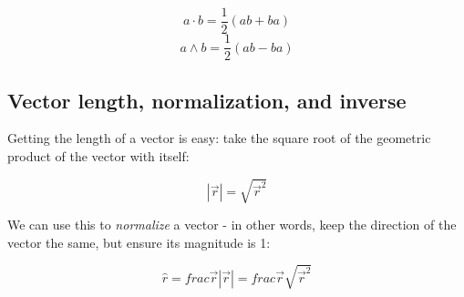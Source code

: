$$ a \cdot b = \frac{1}{2}\left(ab + ba\right)$$
$$ a \wedge b = \frac{1}{2}\left(ab - ba\right)$$

\subsection{Vector length, normalization, and inverse}

Getting the length of a vector is easy: take the square root of the geometric product of the vector
with itself:

$$\left|\vec{r}\right| = \sqrt{\vec{r}^2}$$

We can use this to \textit{normalize} a vector - in other words, keep the direction of the vector 
the same, but ensure its magnitude is 1:

$$\hat{r} = frac{\vec{r}}{\left|\vec{r}\right|} = frac{\vec{r}}{\sqrt{\vec{r}^2}}$$
